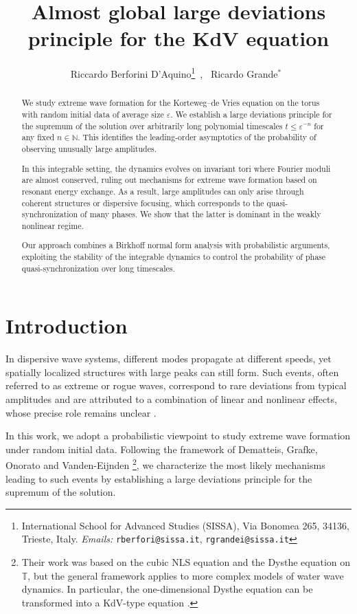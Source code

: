 \documentclass[a4paper,10pt,reqno]{article}
\title{ {\bf Almost global large deviations principle for the KdV equation}}
\date{}
\author{Riccardo Berforini D'Aquino\footnote{International School for Advanced Studies (SISSA), Via Bonomea 265, 34136, Trieste, Italy. \newline
	\textit{Emails:} \texttt{rberfori@sissa.it}, \texttt{rgrandei@sissa.it}}\, \orcidlink{0009-0006-0436-6167}, 
\ Ricardo Grande$^*$\ \orcidlink{0000-0002-1521-6790}}
\theoremstyle{definition}
\theoremstyle{plain}
\theoremstyle{plain}
\theoremstyle{definition}
\theoremstyle{plain}
\theoremstyle{plain}
\theoremstyle{plain}
\theoremstyle{definition}
\theoremstyle{definition}
\def \N{\mathbb N}
\def \T{\mathbb{T}}
\begin{document}
\maketitle
\begin{abstract}
We study extreme wave formation for the Korteweg–de Vries equation on the torus with random initial data of average size $\varepsilon$. 
We establish a large deviations principle for the supremum of the solution over arbitrarily long polynomial timescales $t\leq \varepsilon^{-n}$ for any fixed $n\in\N$. This identifies the leading-order asymptotics of the probability of observing unusually large amplitudes.

In this integrable setting, the dynamics evolves on invariant tori where Fourier moduli are almost conserved, ruling out mechanisms for extreme wave formation based on resonant energy exchange. 
As a result, large amplitudes can only arise through coherent structures or dispersive focusing, which corresponds to the quasi-synchronization of many phases. 
We show that the latter is dominant in the weakly nonlinear regime.

Our approach combines a Birkhoff normal form analysis with probabilistic arguments, exploiting the stability of the integrable dynamics to control the probability of phase quasi-synchronization over long timescales.
\end{abstract}


\tableofcontents


\section{Introduction} \label{section: introduction}


In dispersive wave systems, different modes propagate at different speeds, yet spatially localized structures with large peaks can still form. Such events, often referred to as extreme or rogue waves, correspond to rare deviations from typical amplitudes and are attributed to a combination of linear and nonlinear effects, whose precise role remains unclear \cite{onorato}.

\smallskip

In this work, we adopt a probabilistic viewpoint to study extreme wave formation under random initial data. Following the framework of Dematteis, Grafke, Onorato and Vanden-Eijnden \cite{dematteis2,dematteis}\footnote{Their work was based on the cubic NLS equation and the Dysthe equation on $\T$, but the general framework applies to more complex models of water wave dynamics.
In particular, the one-dimensional Dysthe equation can be transformed into a KdV-type equation \cite{GKS,saut}.}, we characterize the most likely mechanisms leading to such events by establishing a large deviations principle for the supremum of the solution.
\end{document}
